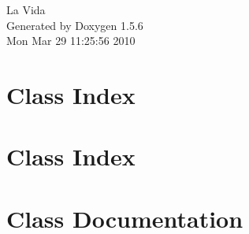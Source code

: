\documentclass[a4paper]{book}
\begin{document}
\begin{titlepage}
\vspace*{7cm}
\begin{center}
{\Large La Vida }\\
\vspace*{1cm}
{\large Generated by Doxygen 1.5.6}\\
\vspace*{0.5cm}
{\small Mon Mar 29 11:25:56 2010}\\
\end{center}
\end{titlepage}
\clearemptydoublepage
{}
\tableofcontents
\clearemptydoublepage
{}
\chapter{Class Index}

\chapter{Class Index}

\chapter{Class Documentation}















\printindex
\end{document}
